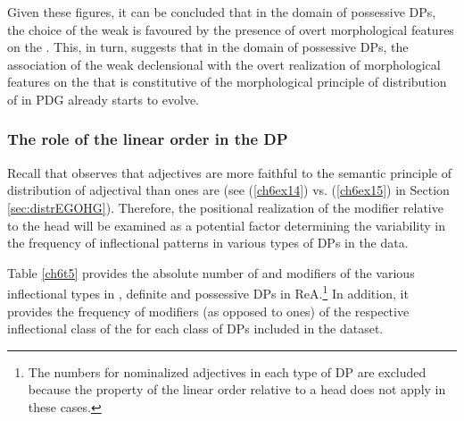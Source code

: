 \documentclass[output=paper,colorlinks,citecolor=brown]{langscibook}
\begin{document}
Given these figures, it can be concluded that in the domain of
possessive DPs, the choice of the weak  is favoured by the
presence of overt morphological features on the . This, in
turn, suggests that in the domain of possessive DPs, the association of
the weak declensional  with the overt realization of
morphological features on the  that is constitutive of the
morphological principle of distribution of  in PDG
already starts to evolve.

\subsubsection{The role of the linear order in the DP}\label{sec:linorder}
Recall that \citet{Demske01} observes that  adjectives are more
faithful to the semantic principle of distribution of adjectival
 than  ones are (see (\ref{ch6ex14}) vs. (\ref{ch6ex15}) in Section \ref{sec:distrEGOHG}).
Therefore, the positional realization of the modifier relative to the
head  will be examined as a potential factor determining the
variability in the frequency of inflectional patterns in various types
of DPs in the data.

Table \ref{ch6t5} provides the absolute number of  and 
modifiers of the various inflectional types in , definite and
possessive DPs in ReA.\footnote{The numbers for nominalized adjectives
  in each type of DP are excluded because the property of the linear
  order relative to a head  does not apply in these cases.} In
addition, it provides the frequency of  modifiers (as opposed
to  ones) of the respective inflectional class of the
 for each class of DPs included in the dataset.
\end{document}
